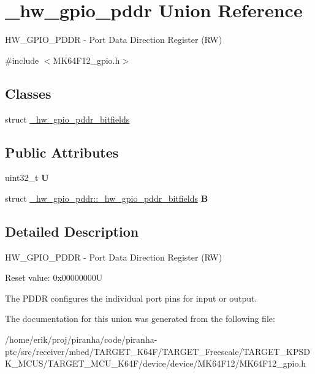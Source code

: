 \hypertarget{union__hw__gpio__pddr}{}\section{\+\_\+hw\+\_\+gpio\+\_\+pddr Union Reference}
\label{union__hw__gpio__pddr}


H\+W\+\_\+\+G\+P\+I\+O\+\_\+\+P\+D\+DR -\/ Port Data Direction Register (RW)  




{\ttfamily \#include $<$M\+K64\+F12\+\_\+gpio.\+h$>$}

\subsection*{Classes}
\begin{DoxyCompactItemize}
\item 
struct \hyperlink{struct__hw__gpio__pddr_1_1__hw__gpio__pddr__bitfields}{\+\_\+hw\+\_\+gpio\+\_\+pddr\+\_\+bitfields}
\end{DoxyCompactItemize}
\subsection*{Public Attributes}
\begin{DoxyCompactItemize}
\item 
uint32\+\_\+t {\bfseries U}\hypertarget{union__hw__gpio__pddr_ab345eb09a4905d653b6abeab92934562}{}\label{union__hw__gpio__pddr_ab345eb09a4905d653b6abeab92934562}

\item 
struct \hyperlink{struct__hw__gpio__pddr_1_1__hw__gpio__pddr__bitfields}{\+\_\+hw\+\_\+gpio\+\_\+pddr\+::\+\_\+hw\+\_\+gpio\+\_\+pddr\+\_\+bitfields} {\bfseries B}\hypertarget{union__hw__gpio__pddr_a2dd277118c8564db01d18234468abc02}{}\label{union__hw__gpio__pddr_a2dd277118c8564db01d18234468abc02}

\end{DoxyCompactItemize}


\subsection{Detailed Description}
H\+W\+\_\+\+G\+P\+I\+O\+\_\+\+P\+D\+DR -\/ Port Data Direction Register (RW) 

Reset value\+: 0x00000000U

The P\+D\+DR configures the individual port pins for input or output. 

The documentation for this union was generated from the following file\+:\begin{DoxyCompactItemize}
\item 
/home/erik/proj/piranha/code/piranha-\/ptc/src/receiver/mbed/\+T\+A\+R\+G\+E\+T\+\_\+\+K64\+F/\+T\+A\+R\+G\+E\+T\+\_\+\+Freescale/\+T\+A\+R\+G\+E\+T\+\_\+\+K\+P\+S\+D\+K\+\_\+\+M\+C\+U\+S/\+T\+A\+R\+G\+E\+T\+\_\+\+M\+C\+U\+\_\+\+K64\+F/device/device/\+M\+K64\+F12/M\+K64\+F12\+\_\+gpio.\+h\end{DoxyCompactItemize}
